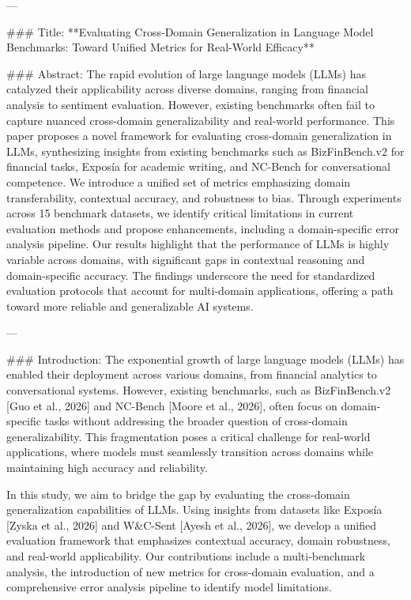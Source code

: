 ---

### Title:
**Evaluating Cross-Domain Generalization in Language Model Benchmarks: Toward Unified Metrics for Real-World Efficacy**

### Abstract:
The rapid evolution of large language models (LLMs) has catalyzed their applicability across diverse domains, ranging from financial analysis to sentiment evaluation. However, existing benchmarks often fail to capture nuanced cross-domain generalizability and real-world performance. This paper proposes a novel framework for evaluating cross-domain generalization in LLMs, synthesizing insights from existing benchmarks such as BizFinBench.v2 for financial tasks, Exposía for academic writing, and NC-Bench for conversational competence. We introduce a unified set of metrics emphasizing domain transferability, contextual accuracy, and robustness to bias. Through experiments across 15 benchmark datasets, we identify critical limitations in current evaluation methods and propose enhancements, including a domain-specific error analysis pipeline. Our results highlight that the performance of LLMs is highly variable across domains, with significant gaps in contextual reasoning and domain-specific accuracy. The findings underscore the need for standardized evaluation protocols that account for multi-domain applications, offering a path toward more reliable and generalizable AI systems.

---

### Introduction:
The exponential growth of large language models (LLMs) has enabled their deployment across various domains, from financial analytics to conversational systems. However, existing benchmarks, such as BizFinBench.v2 [Guo et al., 2026] and NC-Bench [Moore et al., 2026], often focus on domain-specific tasks without addressing the broader question of cross-domain generalizability. This fragmentation poses a critical challenge for real-world applications, where models must seamlessly transition across domains while maintaining high accuracy and reliability.

In this study, we aim to bridge the gap by evaluating the cross-domain generalization capabilities of LLMs. Using insights from datasets like Exposía [Zyska et al., 2026] and W&C-Sent [Ayesh et al., 2026], we develop a unified evaluation framework that emphasizes contextual accuracy, domain robustness, and real-world applicability. Our contributions include a multi-benchmark analysis, the introduction of new metrics for cross-domain evaluation, and a comprehensive error analysis pipeline to identify model limitations.

